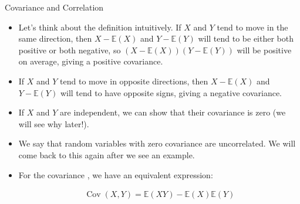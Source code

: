 \documentclass[8pt, usepdftitle = false]{beamer}
\begin{document}
\begin{frame}{Covariance and Correlation}


\begin{itemize}



  \item Let's think about the definition intuitively. If $X$ and $Y$ tend to move in the same direction, then $X- \mathbb{E}(X)$ and $Y-\mathbb{E}(Y)$ will tend to be either both positive or both negative, so $(X-\mathbb{E}(X))(Y-\mathbb{E}(Y))$ will be positive on average, giving a positive covariance. 


  \item If $X$ and $Y$ tend to move in opposite directions, then $X-\mathbb{E}(X)$ and $Y-\mathbb{E}(Y)$ will tend to have opposite signs, giving a negative covariance.

  \item If $X$ and $Y$ are independent, we can show that their covariance is zero (we will see why later!). 

  \item We say that random variables with zero covariance are \alert{uncorrelated}. We will come back to this again after we see an example.


    \item For the covariance , we have an equivalent expression:
    
    \begin{align*}
    \operatorname{Cov}(X, Y)=\mathbb{E}(X Y)-\mathbb{E}(X) \mathbb{E}(Y)
    \end{align*}

  \end{itemize}

\end{frame}
\end{document}
